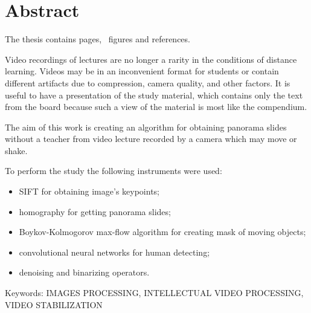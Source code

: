 \chapter*{Abstract}

The thesis contains
\pageref{LastPage}
pages, \totalfigures\ figures
and  references.

Video recordings of lectures are no longer a rarity in
the conditions of distance learning.
Videos may be in an inconvenient format for
students or contain different artifacts due
to compression, camera quality, and other factors.
It is useful to have a presentation of the study material,
which contains only the text from the board
because such a view of the material is most
like the compendium.

The aim of this work
is creating an algorithm for obtaining panorama
slides without a teacher from video lecture
recorded by a camera which may move or shake.

To perform the study the following instruments were used:
\begin{itemize}
      \item
            SIFT for obtaining image's keypoints;
      \item
            homography for getting panorama slides;
      \item
            Boykov-Kolmogorov max-flow algorithm for creating mask of
            moving objects;
      \item
            convolutional neural networks for human detecting;
      \item
            denoising and binarizing operators.
\end{itemize}

Keywords:
\MakeUppercase{images processing, intellectual video
      processing, video stabilization}
